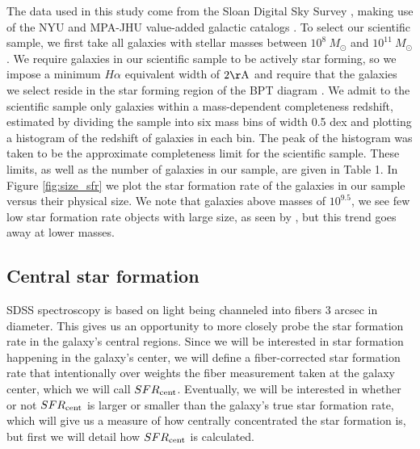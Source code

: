 \documentclass[iop]{emulateapj}
\begin{document}
The data used in this study come from the Sloan Digital Sky Survey \citep[SDSS,][]{SDSS}, making use of the NYU and MPA-JHU value-added galactic catalogs \citep{Kauffmann03,Brinchmann04,blanton05vagc}. To select our scientific sample, we first take all galaxies with stellar masses between $10^{8}\ M_{\odot}$ and $10^{11}\ M_{\odot}$. We require galaxies in our scientific sample to be actively star forming, so we impose a minimum $H\alpha$ equivalent width of $2 \rm \AA$ and require that the galaxies we select reside in the star forming region of the BPT diagram \citep{BPT}. We admit to the scientific sample only galaxies within a mass-dependent completeness redshift, estimated by dividing the sample into six mass bins of width 0.5 dex and plotting a histogram of the redshift of galaxies in each bin. The peak of the histogram was taken to be the approximate completeness limit for the scientific sample. These limits, as well as the number of galaxies in our sample, are given in Table 1. In Figure \ref{fig:size_sfr} we plot the star formation rate of the galaxies in our sample versus their physical size. We note that galaxies above masses of $10^{9.5}$, we see few low star formation rate objects with large size, as seen by \citet{Patel18}, but this trend goes away at lower masses.


\subsection{Central star formation}
\label{sec:fibercor}
SDSS spectroscopy is based on light being channeled into fibers $3$ arcsec in diameter. This gives us an opportunity to more closely probe the star formation rate in the galaxy's central regions. Since we will be interested in star formation happening in the galaxy's center, we will define a fiber-corrected star formation rate that intentionally over weights the fiber measurement taken at the galaxy center, which we will call $SFR_{\rm cent}$. Eventually, we will be interested in whether or not $SFR_{\rm cent}$ is larger or smaller than the galaxy's true star formation rate, which will give us a measure of how centrally concentrated the star formation is, but first we will detail how $SFR_{\rm cent}$ is calculated.
\end{document}
